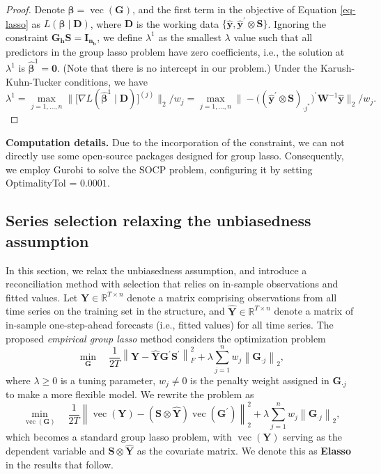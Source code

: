 \documentclass[
  11pt]{article}
\theoremstyle{plain}
\theoremstyle{remark}
\begin{document}
\begin{proof}
Denote \(\bm{\beta} = \operatorname{vec}(\bm{G})\), and the first term
in the objective of Equation \eqref{eq-lasso} as
\(L\left(\bm{\beta} \mid \bm{D}\right)\), where \(\bm{D}\) is the
working data
\(\{\hat{\bm{y}} , \hat{\bm{y}}^{\prime} \otimes \bm{S}\}\). Ignoring
the constraint \(\bm{G_h S}=\bm{I_{n_b}}\), we define \(\lambda^{1}\) as
the smallest \(\lambda\) value such that all predictors in the group
lasso problem have zero coefficients, i.e., the solution at
\(\lambda^{1}\) is \(\hat{\bm{\beta}}^{1}=\bm{0}\). (Note that there is
no intercept in our problem.) Under the Karush-Kuhn-Tucker conditions,
we have \[
\lambda^{1}
 = \max_{j=1, \ldots, n}\big\|\big[\nabla L(\hat{\bm{\beta}}^{1} \mid \bm{D})\big]^{(j)}\big\|_2 / w_j
 = \max_{j=1, \ldots, n}\big\|-\big((\hat{\bm{y}}^{\prime} \otimes \bm{S})_{\cdot j^{*}}\big)^{\prime} \bm{W}^{-1} \hat{\bm{y}}\big\|_2 / w_j.
\]
\end{proof}

\textbf{Computation details.} Due to the incorporation of the
constraint, we can not directly use some open-source packages designed
for group lasso. Consequently, we employ Gurobi to solve the SOCP
problem, configuring it by setting OptimalityTol = \(0.0001\).

\subsection{Series selection relaxing the unbiasedness
assumption}\label{sec-unconstrained}

In this section, we relax the unbiasedness assumption, and introduce a
reconciliation method with selection that relies on in-sample
observations and fitted values. Let
\(\bm{Y} \in \mathbb{R}^{T \times n}\) denote a matrix comprising
observations from all time series on the training set in the structure,
and \(\hat{\bm{Y}} \in \mathbb{R}^{T \times n}\) denote a matrix of
in-sample one-step-ahead forecasts (i.e., fitted values) for all time
series. The proposed \emph{empirical group lasso} method considers the
optimization problem \[
\min_{\bm{G}} \quad \frac{1}{2 T} \left\|\bm{Y}-\hat{\bm{Y}} \bm{G}^{\prime} \bm{S}^{\prime}\right\|_F^2 + \lambda \sum_{j=1}^n w_j \left\|\bm{G}_{\cdot j}\right\|_2,
\] where \(\lambda \geq 0\) is a tuning parameter, \(w_j \neq 0\) is the
penalty weight assigned in \(\bm{G}_{\cdot j}\) to make a more flexible
model. We rewrite the problem as \[
\min_{\operatorname{vec}(\bm{G})} \quad \frac{1}{2 T} \left\|\operatorname{vec}(\bm{Y})-(\bm{S} \otimes \hat{\bm{Y}}) \operatorname{vec}\left(\bm{G}^{\prime}\right)\right\|_2^2 + \lambda \sum_{j=1}^n w_j \left\|\bm{G}_{\cdot j}\right\|_2,
\] which becomes a standard group lasso problem, with
\(\operatorname{vec}(\bm{Y})\) serving as the dependent variable and
\(\bm{S} \otimes \hat{\bm{Y}}\) as the covariate matrix. We denote this
as \textbf{Elasso} in the results that follow.
\end{document}
